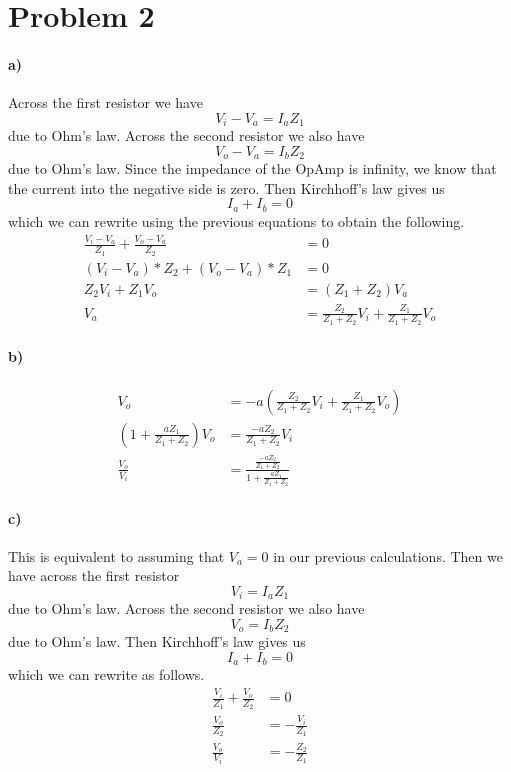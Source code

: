 \documentclass[12pt]{article}
\begin{document}
\section*{Problem 2}

\paragraph{a)}

Across the first resistor we have
\[V_i-V_a = I_aZ_1\]
due to Ohm's law. Across the second resistor we also have
\[V_o-V_a = I_bZ_2\]
due to Ohm's law. Since the impedance of the OpAmp is infinity, we know that the current into the negative side is zero.
Then Kirchhoff's law gives us
\[I_a + I_b = 0\]
which we can rewrite using the previous equations to obtain the following.
\begin{align*}
    \frac{V_i-V_a}{Z_1} + \frac{V_o-V_a}{Z_2} &= 0\\
    (V_i-V_a)*Z_2 + (V_o-V_a)*Z_1 &= 0\\
    Z_2V_i + Z_1V_o &= (Z_1+Z_2)V_a\\
    V_a &= \frac{Z_2}{Z_1+Z_2}V_i + \frac{Z_1}{Z_1+Z_2}V_o
\end{align*}

\paragraph{b)}

\begin{align*}
    V_o&=-a\left(\frac{Z_2}{Z_1+Z_2}V_i + \frac{Z_1}{Z_1+Z_2}V_o\right)\\
    \left(1+\frac{aZ_1}{Z_1+Z_2}\right)V_o&=\frac{-aZ_2}{Z_1+Z_2}V_i\\
    \frac{V_o}{V_i}&=\frac{\frac{-aZ_2}{Z_1+Z_2}}{1+\frac{aZ_1}{Z_1+Z_2}}
\end{align*}

\paragraph{c)}

This is equivalent to assuming that \(V_a=0\) in our previous calculations. Then we have across the first resistor
\[V_i = I_aZ_1\]
due to Ohm's law. Across the second resistor we also have
\[V_o = I_bZ_2\]
due to Ohm's law. Then Kirchhoff's law gives us
\[I_a + I_b = 0\]
which we can rewrite as follows.
\begin{align*}
    \frac{V_i}{Z_1} + \frac{V_o}{Z_2} &= 0\\
    \frac{V_o}{Z_2} &= -\frac{V_i}{Z_1}\\
    \frac{V_o}{V_i} &= -\frac{Z_2}{Z_1}
\end{align*}
\end{document}
